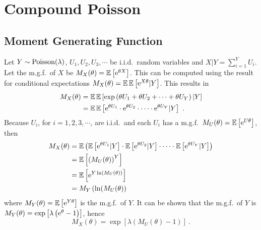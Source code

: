 \chapter{Compound Poisson}

\section{Moment Generating Function}
\label{chapter:appendix_compoundPoissonMgf}

Let $Y\sim\operatorname{Poisson}(\lambda)$, $U_1,U_2,U_3,\cdots$ be i.i.d.~random variables and $X|Y=\sum_{i=1}^YU_i$. Let the m.g.f.~of $X$ be $M_X(\theta)=\operatorname{\mathbb{E}}\left[\mathrm{e}^{\theta X}\right]$. This can be computed using the result for conditional expectations $M_X(\theta)=\operatorname{\mathbb{E}}\operatorname{\mathbb{E}}\left[\mathrm{e}^{X\theta}|Y\right]$. This results in 
\begin{align}
  M_X(\theta)&=\operatorname{\mathbb{E}}\operatorname{\mathbb{E}}\left[\exp\left(\theta U_1 + \theta U_2 + \cdots + \theta U_Y\right)|Y\right]
  \nonumber \\
  &=\operatorname{\mathbb{E}}\operatorname{\mathbb{E}}\left[\mathrm{e}^{\theta U_1}\cdot\mathrm{e}^{\theta U_2}\cdot\cdots\cdot\mathrm{e}^{\theta U_Y}|Y\right]
  \ .
\end{align}
Because $U_i$, for $i=1,2,3,\cdots$, are i.i.d.~and each $U_i$ has a m.g.f.~$M_U(\theta)=\operatorname{\mathbb{E}}\left[\mathrm{e}^{U\theta}\right]$, then
\begin{align}
  M_X(\theta)&=\operatorname{\mathbb{E}}\left(
    \operatorname{\mathbb{E}}\left[\mathrm{e}^{\theta U_1}|Y\right]\cdot
    \operatorname{\mathbb{E}}\left[\mathrm{e}^{\theta U_2}|Y\right]\cdot
    \cdots \cdot
    \operatorname{\mathbb{E}}\left[\mathrm{e}^{\theta U_Y}|Y\right]
  \right)
  \nonumber\\
  &=\operatorname{\mathbb{E}}\left[\left(M_U(\theta)\right)^Y\right]
  \nonumber\\
  &=\operatorname{\mathbb{E}}\left[\mathrm{e}^{Y\ln(M_U(\theta))}\right]
  \nonumber\\
  & = M_Y\left(\ln(M_U(\theta)\right)
\end{align}
where $M_Y(\theta)=\operatorname{\mathbb{E}}\left[\mathrm{e}^{Y\theta}\right]$ is the m.g.f.~of $Y$. It can be shown that the m.g.f.~of $Y$ is
$
  M_Y(\theta)=
  \exp
  \left[
    \lambda
    \left(
      \mathrm{e}^\theta-1
    \right)
  \right]
$,
hence
\begin{equation}
  M_X(\theta)=
  \exp\left[
    \lambda
    \left(
      M_U(\theta)-1
    \right)
  \right]
  \ .
\end{equation}

